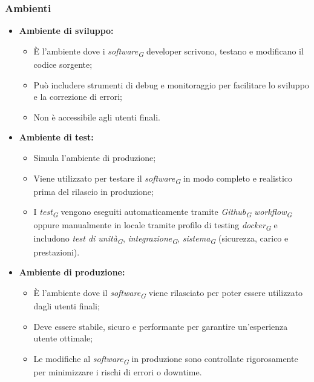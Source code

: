 \subsubsection{Ambienti}
\begin{itemize}
  \item \textbf{Ambiente di sviluppo:}
    \begin{itemize}
      \item È l'ambiente dove i \textit{software}\textsubscript{\textit{G}} developer scrivono, testano e modificano il codice sorgente;
      \item Può includere strumenti di debug e monitoraggio per facilitare lo sviluppo e la correzione di errori;
      \item Non è accessibile agli utenti finali.
    \end{itemize}
    \item \textbf{Ambiente di test:}
    \begin{itemize}
      \item Simula l'ambiente di produzione;
      \item Viene utilizzato per testare il \textit{software}\textsubscript{\textit{G}} in modo completo e realistico prima del rilascio in produzione;
      \item I \textit{test}\textsubscript{\textit{G}} vengono eseguiti automaticamente tramite \textit{Github}\textsubscript{\textit{G}} \textit{workflow}\textsubscript{\textit{G}} oppure manualmente in locale tramite profilo di testing \textit{docker}\textsubscript{\textit{G}} e includono \textit{test di unità}\textsubscript{\textit{G}}, \textit{integrazione}\textsubscript{\textit{G}}, \textit{sistema}\textsubscript{\textit{G}} (sicurezza, carico e prestazioni).
    \end{itemize}
    \item \textbf{Ambiente di produzione:}
    \begin{itemize}
      \item È l'ambiente dove il \textit{software}\textsubscript{\textit{G}} viene rilasciato per poter essere utilizzato dagli utenti finali;
      \item Deve essere stabile, sicuro e performante per garantire un'esperienza utente ottimale;
      \item Le modifiche al \textit{software}\textsubscript{\textit{G}} in produzione sono controllate rigorosamente per minimizzare i rischi di errori o downtime.
    \end{itemize}
\end{itemize}

